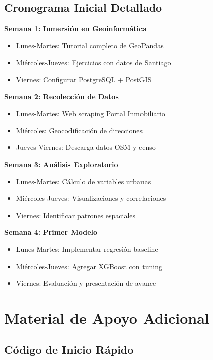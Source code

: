 \documentclass[12pt,a4paper]{article}
\begin{document}
\subsection{Cronograma Inicial Detallado}

\textbf{Semana 1: Inmersión en Geoinformática}
\begin{itemize}
    \item Lunes-Martes: Tutorial completo de GeoPandas
    \item Miércoles-Jueves: Ejercicios con datos de Santiago
    \item Viernes: Configurar PostgreSQL + PostGIS
\end{itemize}

\textbf{Semana 2: Recolección de Datos}
\begin{itemize}
    \item Lunes-Martes: Web scraping Portal Inmobiliario
    \item Miércoles: Geocodificación de direcciones
    \item Jueves-Viernes: Descarga datos OSM y censo
\end{itemize}

\textbf{Semana 3: Análisis Exploratorio}
\begin{itemize}
    \item Lunes-Martes: Cálculo de variables urbanas
    \item Miércoles-Jueves: Visualizaciones y correlaciones
    \item Viernes: Identificar patrones espaciales
\end{itemize}

\textbf{Semana 4: Primer Modelo}
\begin{itemize}
    \item Lunes-Martes: Implementar regresión baseline
    \item Miércoles-Jueves: Agregar XGBoost con tuning
    \item Viernes: Evaluación y presentación de avance
\end{itemize}

\section{Material de Apoyo Adicional}

\subsection{Código de Inicio Rápido}
\end{document}
